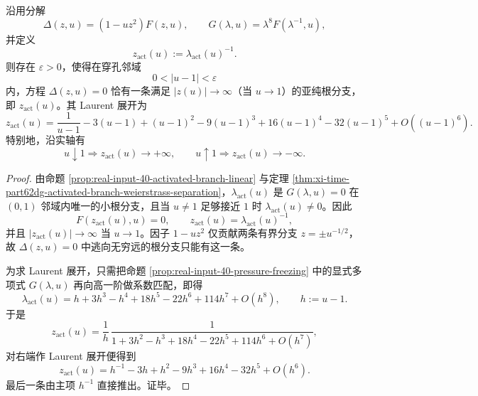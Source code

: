 \begin{conclusion}\label{con:xi-time-part62dga-activated-escape-root-laurent}
沿用分解
\[
\Delta(z,u)=(1-uz^2)F(z,u),
\qquad
G(\lambda,u)=\lambda^8F(\lambda^{-1},u),
\]
并定义
\[
z_{\mathrm{act}}(u):=\lambda_{\mathrm{act}}(u)^{-1}.
\]
则存在 \(\varepsilon>0\)，使得在穿孔邻域
\[
0<|u-1|<\varepsilon
\]
内，方程 \(\Delta(z,u)=0\) 恰有一条满足 \(|z(u)|\to\infty\)（当 \(u\to 1\)）的亚纯根分支，即 \(z_{\mathrm{act}}(u)\)。其 Laurent 展开为
\[
z_{\mathrm{act}}(u)
=
\frac{1}{u-1}
-3(u-1)
+(u-1)^2
-9(u-1)^3
+16(u-1)^4
-32(u-1)^5
+O((u-1)^6).
\]
特别地，沿实轴有
\[
u\downarrow 1 \Longrightarrow z_{\mathrm{act}}(u)\to +\infty,
\qquad
u\uparrow 1 \Longrightarrow z_{\mathrm{act}}(u)\to -\infty.
\]
\end{conclusion}
\begin{proof}
由命题 \ref{prop:real-input-40-activated-branch-linear} 与定理 \ref{thm:xi-time-part62dg-activated-branch-weierstrass-separation}，\(\lambda_{\mathrm{act}}(u)\) 是 \(G(\lambda,u)=0\) 在 \((0,1)\) 邻域内唯一的小根分支，且当 \(u\neq 1\) 足够接近 \(1\) 时 \(\lambda_{\mathrm{act}}(u)\neq 0\)。因此
\[
F(z_{\mathrm{act}}(u),u)=0,
\qquad
z_{\mathrm{act}}(u)=\lambda_{\mathrm{act}}(u)^{-1},
\]
并且 \(|z_{\mathrm{act}}(u)|\to\infty\) 当 \(u\to 1\)。因子 \(1-uz^2\) 仅贡献两条有界分支 \(z=\pm u^{-1/2}\)，故 \(\Delta(z,u)=0\) 中逃向无穷远的根分支只能有这一条。
\par
为求 Laurent 展开，只需把命题 \ref{prop:real-input-40-pressure-freezing} 中的显式多项式 \(G(\lambda,u)\) 再向高一阶做系数匹配，即得
\[
\lambda_{\mathrm{act}}(u)
=
h+3h^3-h^4+18h^5-22h^6+114h^7+O(h^8),
\qquad
h:=u-1.
\]
于是
\[
z_{\mathrm{act}}(u)
=
\frac{1}{h}\,
\frac{1}{1+3h^2-h^3+18h^4-22h^5+114h^6+O(h^7)},
\]
对右端作 Laurent 展开便得到
\[
z_{\mathrm{act}}(u)
=
h^{-1}-3h+h^2-9h^3+16h^4-32h^5+O(h^6).
\]
最后一条由主项 \(h^{-1}\) 直接推出。证毕。
\end{proof}

